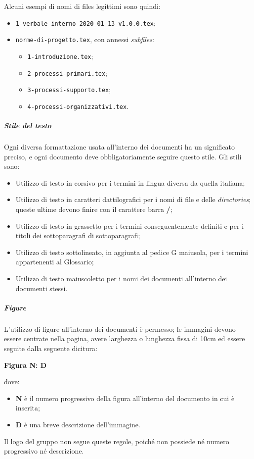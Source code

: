 \documentclass[../norme-di-progetto.tex]{subfiles}
\begin{document}
Alcuni esempi di nomi di files legittimi sono quindi:
\begin{itemize}
  \item \texttt{1-verbale-interno\_2020\_01\_13\_v1.0.0.tex};
  \item \texttt{norme-di-progetto.tex}, con annessi \textit{subfiles}:
    \begin{itemize}
      \item \texttt{1-introduzione.tex};
      \item \texttt{2-processi-primari.tex};
      \item \texttt{3-processi-supporto.tex};
      \item \texttt{4-processi-organizzativi.tex}.
    \end{itemize}
\end{itemize}

\subparagraph{Stile del testo}
Ogni diversa formattazione usata all'interno dei documenti ha un significato preciso, e ogni documento deve obbligatoriamente seguire questo stile. Gli stili sono:
\begin{itemize}
  \item Utilizzo di testo in corsivo per i termini in lingua diversa da quella italiana;
  \item Utilizzo di testo in caratteri dattilografici per i nomi di file e delle \textit{directories}; queste ultime devono finire con il carattere barra \textbf{/};
  \item Utilizzo di testo in grassetto per i termini conseguentemente definiti e per i titoli dei sottoparagrafi di sottoparagrafi;
  \item Utilizzo di testo sottolineato, in aggiunta al pedice G maiusola, per i termini appartenenti al Glossario;
  \item Utilizzo di testo maiuscoletto per i nomi dei documenti all'interno dei documenti stessi.
\end{itemize}

\subparagraph{Figure}
L'utilizzo di figure all'interno dei documenti è permesso; le immagini devono essere centrate nella pagina, avere larghezza o lunghezza fissa di 10cm ed essere seguite dalla seguente dicitura: \\ \begin{center}
  \centering
  \textbf{Figura N: D}
\end{center} dove:
\begin{itemize}
  \item \textbf{N} è il numero progressivo della figura all'interno del documento in cui è inserita;
  \item \textbf{D} è una breve descrizione dell'immagine.
\end{itemize}
Il logo del gruppo non segue queste regole, poiché non possiede né numero progressivo né descrizione.
\end{document}
